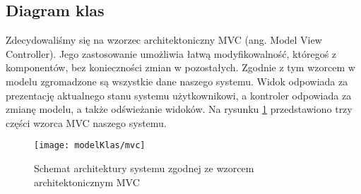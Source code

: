 \subsection{Diagram klas}

Zdecydowaliśmy się na wzorzec architektoniczny MVC (ang. Model View Controller). 
Jego zastosowanie umożliwia łatwą modyfikowalność, któregoś z komponentów, bez                                                                                               
konieczności zmian w pozostałych. Zgodnie z tym wzorcem w modelu zgromadzone są wszystkie dane naszego systemu. 
Widok odpowiada za prezentację aktualnego stanu systemu użytkownikowi, a kontroler odpowiada za zmianę modelu, a także odświeżanie widoków.
Na rysunku \ref{fig:mvc} przedstawiono trzy części wzorca MVC naszego systemu.

\begin{figure}[h]
    \centering
    \texttt{[image: modelKlas/mvc]}
    \caption{Schemat architektury systemu zgodnej ze wzorcem architektonicznym MVC}
    \label{fig:mvc}
\end{figure}


